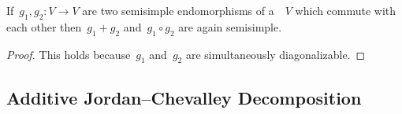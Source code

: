 % 
% 
%   
% 
% 


\begin{lemma}
  \label{combination of ss endomorphisms}
  If~$g_1, g_2 \colon V \to V$ are two semisimple endomorphisms of a~~$V$ which commute with each other then~$g_1 + g_2$ and~$g_1 \circ g_2$ are again semisimple.
\end{lemma}


\begin{proof}
  This holds because~$g_1$ and~$g_2$ are simultaneously diagonalizable.
\end{proof}


\subsection{Additive Jordan--Chevalley Decomposition}

